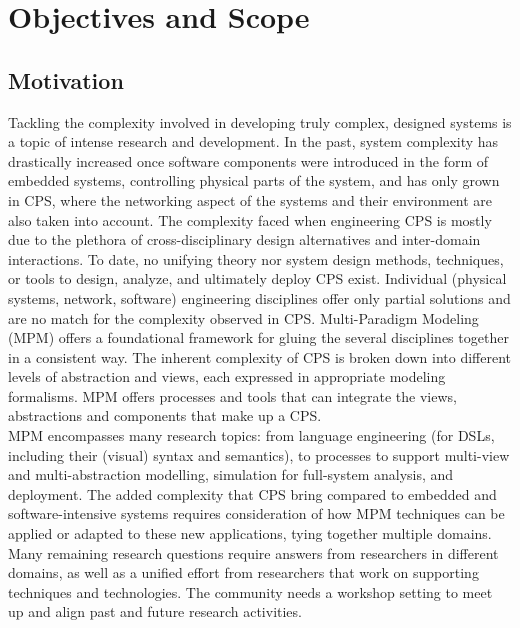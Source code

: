 \section{Objectives and Scope}

\subsection{Motivation}
Tackling the complexity involved in developing truly complex, designed systems 
is a topic of intense research and development.
In the past, system complexity has drastically increased once software components 
were introduced in the form of embedded systems, controlling physical parts of 
the system, and has only grown in CPS, where the networking aspect of the systems 
and their environment are also taken into account.
The complexity faced when engineering CPS is mostly due to the plethora of 
cross-disciplinary design alternatives and inter-domain interactions.
To date, no unifying theory nor system design methods, techniques, or tools to 
design, analyze, and ultimately deploy CPS exist.
Individual (physical systems, network, software) engineering disciplines offer 
only partial solutions and are no match for the complexity observed in CPS.
Multi-Paradigm Modeling (MPM) offers a foundational framework for gluing the 
several disciplines together in a consistent way.
The inherent complexity of CPS is broken down into different levels of 
abstraction and views, each expressed in appropriate modeling formalisms.
MPM offers processes and tools that can integrate the views, abstractions and 
components that make up a CPS.\\
MPM encompasses many research topics: from language engineering (for DSLs, 
including their (visual) syntax and semantics), to processes to support multi-view 
and multi-abstraction modelling, simulation for full-system analysis, and deployment.
The added complexity that CPS bring compared to embedded and software-intensive 
systems requires consideration of how MPM techniques can be applied or adapted 
to these new applications, tying together multiple domains.
Many remaining research questions require answers from researchers in different 
domains, as well as a unified effort from researchers that work on supporting 
techniques and technologies.
The community needs a workshop setting to meet up and align past and future 
research activities.

